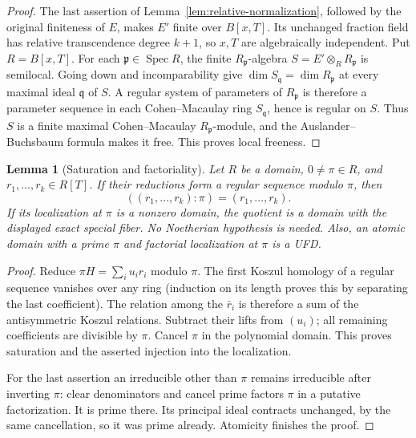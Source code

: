 \documentclass[11pt,reqno]{amsart}
\numberwithin{equation}{section}
\theoremstyle{plain}
\newtheorem{lemma}[theorem]{Lemma}
\theoremstyle{definition}
\theoremstyle{remark}
\begin{document}
\begin{proof}
The last assertion of Lemma~\ref{lem:relative-normalization},
followed by the original finiteness of \(E\), makes \(E'\)
finite over \(B[x,T]\).  Its unchanged fraction field has
relative transcendence degree \(k+1\), so \(x,T\) are algebraically
independent.  Put \(R=B[x,T]\).  For each \(\mathfrak p\in\operatorname{Spec}R\),
the finite \(R_{\mathfrak p}\)-algebra
\(S=E'\otimes_R R_{\mathfrak p}\) is semilocal.  Going down and
incomparability give \(\dim S_{\mathfrak q}=\dim R_{\mathfrak p}\)
at every maximal ideal \(\mathfrak q\) of \(S\).  A regular system
of parameters of \(R_{\mathfrak p}\) is therefore a parameter
sequence in each Cohen--Macaulay ring \(S_{\mathfrak q}\), hence
is regular on \(S\).  Thus \(S\) is a finite maximal Cohen--Macaulay
\(R_{\mathfrak p}\)-module, and the Auslander--Buchsbaum formula
makes it free.  This proves local freeness.
\end{proof}

\begin{lemma}[Saturation and factoriality]\label{lem:relative-saturation}
Let \(R\) be a domain, \(0\ne\pi\in R\), and
\(r_1,\ldots,r_k\in R[T]\).  If their reductions form a
regular sequence modulo \(\pi\), then
\[
 ((r_1,\ldots,r_k):\pi)=(r_1,\ldots,r_k).
\]
If its localization at \(\pi\) is a nonzero domain, the quotient
is a domain with the displayed exact special fiber.  No
Noetherian hypothesis is needed.  Also, an atomic domain with a
prime \(\pi\) and factorial localization at \(\pi\) is a UFD.
\end{lemma}

\begin{proof}
Reduce \(\pi H=\sum_i u_i r_i\) modulo \(\pi\).  The first
Koszul homology of a regular sequence vanishes over any ring
(induction on its length proves this by separating the last
coefficient).  The relation among the \(\bar r_i\) is therefore
a sum of the antisymmetric Koszul relations.  Subtract their lifts
from \((u_i)\); all remaining coefficients are divisible by
\(\pi\).  Cancel \(\pi\) in the polynomial domain.  This proves
saturation and the asserted injection into the localization.

For the last assertion an irreducible other than \(\pi\) remains
irreducible after inverting \(\pi\): clear denominators and
cancel prime factors \(\pi\) in a putative factorization.  It is
prime there.  Its principal ideal contracts unchanged, by the same
cancellation, so it was prime already.  Atomicity finishes the proof.
\end{proof}
\end{document}
